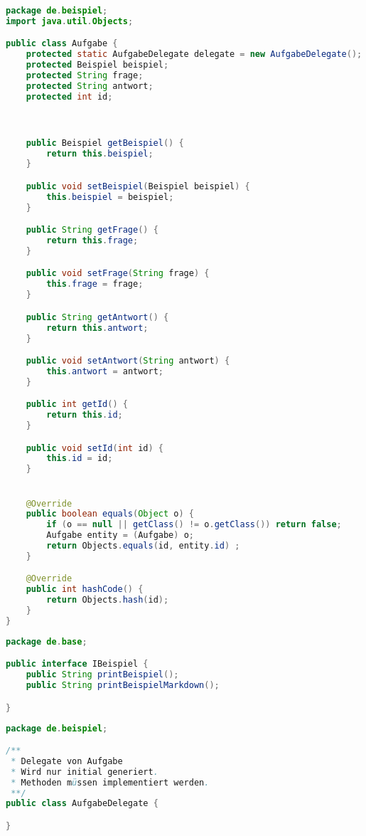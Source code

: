 \documentclass[./einleitung.tex]{subfiles}
\begin{document}
    \begin{lstlisting}[language=java, caption=Aufgabe.java, label=lst:aufgabeJava]
package de.beispiel;
import java.util.Objects;

public class Aufgabe {
    protected static AufgabeDelegate delegate = new AufgabeDelegate();
    protected Beispiel beispiel;
    protected String frage;
    protected String antwort;
    protected int id;



    public Beispiel getBeispiel() {
        return this.beispiel;
    }

    public void setBeispiel(Beispiel beispiel) {
        this.beispiel = beispiel;
    }

    public String getFrage() {
        return this.frage;
    }

    public void setFrage(String frage) {
        this.frage = frage;
    }

    public String getAntwort() {
        return this.antwort;
    }

    public void setAntwort(String antwort) {
        this.antwort = antwort;
    }

    public int getId() {
        return this.id;
    }

    public void setId(int id) {
        this.id = id;
    }


    @Override
    public boolean equals(Object o) {
        if (o == null || getClass() != o.getClass()) return false;
        Aufgabe entity = (Aufgabe) o;
        return Objects.equals(id, entity.id) ;
    }

    @Override
    public int hashCode() {
        return Objects.hash(id);
    }
}
    \end{lstlisting}
    \begin{lstlisting}[language=java, caption=IBeispiel.java, label=lst:ibeispielJava]
package de.base;

public interface IBeispiel {
    public String printBeispiel();
    public String printBeispielMarkdown();

}
    \end{lstlisting}
    \begin{lstlisting}[language=java, caption=AufgabeDelegate.java, label=lst:aufgabeDelegateJava]
package de.beispiel;

/**
 * Delegate von Aufgabe
 * Wird nur initial generiert.
 * Methoden müssen implementiert werden.
 **/
public class AufgabeDelegate {

}
    \end{lstlisting}
\end{document}
